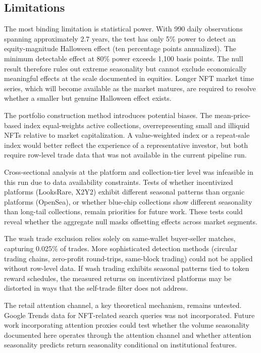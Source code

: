 \documentclass[12pt,a4paper]{article}
\begin{document}
\subsection{Limitations}

The most binding limitation is statistical power. With 990 daily observations spanning approximately 2.7 years, the test has only 5\% power to detect an equity-magnitude Halloween effect (ten percentage points annualized). The minimum detectable effect at 80\% power exceeds 1,100 basis points. The null result therefore rules out extreme seasonality but cannot exclude economically meaningful effects at the scale documented in equities. Longer NFT market time series, which will become available as the market matures, are required to resolve whether a smaller but genuine Halloween effect exists.

The portfolio construction method introduces potential biases. The mean-price-based index equal-weights active collections, overrepresenting small and illiquid NFTs relative to market capitalization. A value-weighted index or a repeat-sale index would better reflect the experience of a representative investor, but both require row-level trade data that was not available in the current pipeline run.

Cross-sectional analysis at the platform and collection-tier level was infeasible in this run due to data availability constraints. Tests of whether incentivized platforms (LooksRare, X2Y2) exhibit different seasonal patterns than organic platforms (OpenSea), or whether blue-chip collections show different seasonality than long-tail collections, remain priorities for future work. These tests could reveal whether the aggregate null masks offsetting effects across market segments.

The wash trade exclusion relies solely on same-wallet buyer-seller matches, capturing 0.025\% of trades. More sophisticated detection methods (circular trading chains, zero-profit round-trips, same-block trading) could not be applied without row-level data. If wash trading exhibits seasonal patterns tied to token reward schedules, the measured returns on incentivized platforms may be distorted in ways that the self-trade filter does not address.

The retail attention channel, a key theoretical mechanism, remains untested. Google Trends data for NFT-related search queries was not incorporated. Future work incorporating attention proxies could test whether the volume seasonality documented here operates through the attention channel and whether attention seasonality predicts return seasonality conditional on institutional features.
\end{document}
